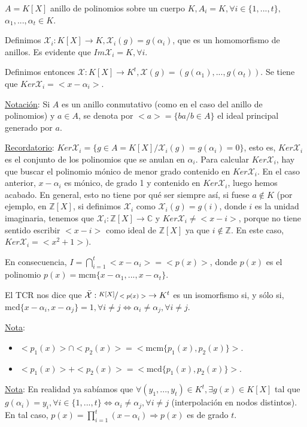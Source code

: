 \documentclass[11pt,a4paper]{article}
\theoremstyle{break}
\begin{document}
$A = K[X]$ anillo de polinomios sobre un cuerpo $K, A_{i} = K, \forall i \in \{1, ..., t\},$ $\alpha_{1}, ..., \alpha_{t} \in K$.

Definimos $\mathcal{X}_{i}: K[X] \to K, \mathcal{X}_{i} (g) = g(\alpha_{i})$, que es un homomorfismo de anillos. Es evidente que $Im \mathcal{X}_{i} = K, \forall i$.

Definimos entonces $\mathcal{X}: K[X] \to K^{t}, \mathcal{X}(g) = (g(\alpha_{1}), ..., g(\alpha_{t}))$. Se tiene que $Ker \mathcal{X}_{i} = <x - \alpha_{i}>$.

\underline{Notación}: Si $A$ es un anillo conmutativo (como en el caso del anillo de polinomios) y $a \in A$, se denota por $<a> = \{ba / b \in A\}$ el ideal principal generado por $a$.

\underline{Recordatorio}: $Ker \mathcal{X}_{i} = \{g \in A = K[X] / \mathcal{X}_{i}(g) = g(\alpha_{i}) = 0\}$, esto es, $Ker \mathcal{X}_{i}$ es el conjunto de los polinomios que se anulan en $\alpha_{i}$. Para calcular $Ker \mathcal{X}_{i}$, hay que buscar el polinomio mónico de menor grado contenido en $Ker \mathcal{X}_{i}$. En el caso anterior, $x - \alpha_{i}$ es mónico, de grado 1 y contenido en $Ker \mathcal{X}_{i}$, luego hemos acabado. En general, esto no tiene por qué ser siempre así, si fuese $a \notin K$ (por ejemplo, en $\mathbb{Z}[X]$, si definimos $\mathcal{X}_{i}$ como $\mathcal{X}_{i}(g) = g(i)$, donde $i$ es la unidad imaginaria, tenemos que $\mathcal{X}_{i}: \mathbb{Z}[X] \to \mathbb{C}$ y $Ker \mathcal{X}_{i} \neq <x-i>$, porque no tiene sentido escribir $<x-i>$ como ideal de $\mathbb{Z}[X]$ ya que $i \notin \mathbb{Z}$. En este caso, $Ker \mathcal{X}_{i} = <x^{2} +1>)$.

En consecuencia, $I = \bigcap_{i=1}^{t} <x - \alpha_{i}> = <p(x)>$, donde $p(x)$ es el polinomio $p(x) = \text{mcm}\{x-\alpha_{1}, ..., x-\alpha_{t}\}$.

El TCR nos dice que $\bar{\mathcal{X}}: \sfrac{K[X]}{<p(x)>} \to K^{t}$ es un isomorfismo si, y sólo si, $\text{mcd}\{x-\alpha_{i}, x-\alpha_{j}\} = 1, \forall i \neq j \iff \alpha_{i} \neq \alpha_{j}, \forall i \neq j$.

\underline{Nota}: \begin{itemize}
\item $<p_{1}(x)> \cap <p_{2}(x)> = <\text{mcm}\{p_{1}(x), p_{2}(x)\}>$.
\item $<p_{1}(x)> + <p_{2}(x)> = <\text{mcd}\{p_{1}(x), p_{2}(x)\}>$.
\end{itemize}

\underline{Nota}: En realidad ya sabíamos que $\forall (y_{1}, ..., y_{t}) \in K^{t}, \exists g(x) \in K[X]$ tal que $g(\alpha_{i}) = y_{i}, \forall i \in \{1, ..., t\} \iff \alpha_{i} \neq \alpha_{j}, \forall i \neq j$ (interpolación en nodos distintos). En tal caso, $p(x) = \prod_{i=1}^{t}(x - \alpha_{i}) \Rightarrow p(x)$ es de grado $t$.
\end{document}
